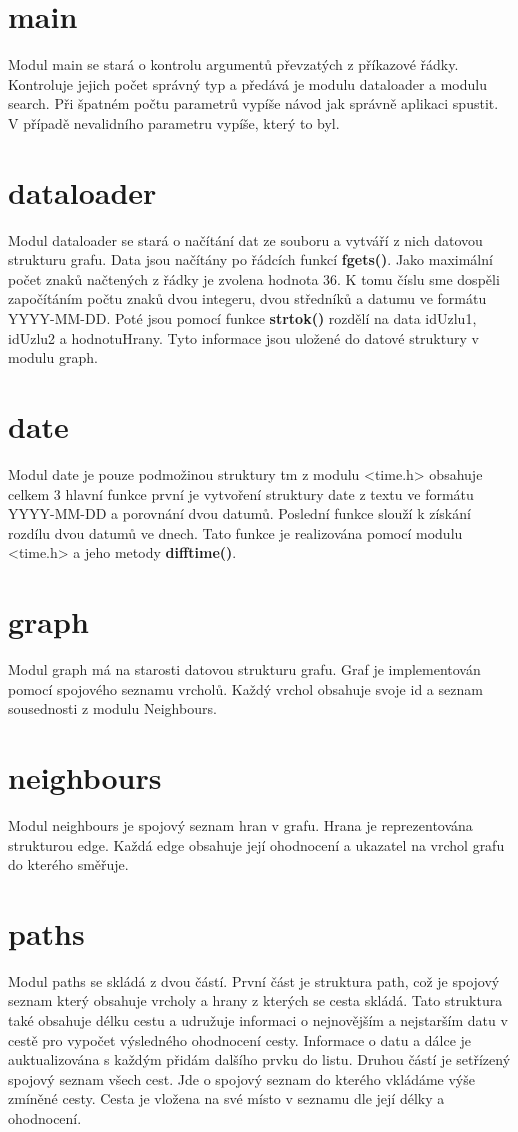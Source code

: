 \section{main}
Modul main se stará o kontrolu argumentů převzatých z příkazové řádky. Kontroluje jejich počet správný typ a předává je modulu dataloader a modulu search. Při špatném počtu parametrů vypíše návod jak správně aplikaci spustit. V případě nevalidního parametru vypíše, který to byl.

\section{dataloader}
Modul dataloader se stará o načítání dat ze souboru a vytváří z nich datovou strukturu grafu. Data jsou načítány po řádcích funkcí \textbf{fgets()}. Jako maximální počet znaků načtených z řádky je zvolena hodnota 36. K tomu číslu sme dospěli započítáním počtu znaků dvou integeru, dvou středníků a datumu ve formátu YYYY-MM-DD. Poté jsou pomocí funkce \textbf{strtok()} rozdělí na data idUzlu1, idUzlu2 a hodnotuHrany. Tyto informace jsou uložené do datové struktury v modulu graph.

\section{date}
Modul date je pouze podmožinou struktury tm z modulu <time.h> obsahuje celkem 3 hlavní funkce první je vytvoření struktury date z textu ve formátu YYYY-MM-DD a porovnání dvou datumů. Poslední funkce slouží k získání rozdílu dvou datumů ve dnech. Tato funkce je realizována pomocí modulu <time.h> a jeho metody \textbf{difftime()}.

\section{graph}
Modul graph má na starosti datovou strukturu grafu. Graf je implementován pomocí spojového seznamu vrcholů. Každý vrchol obsahuje svoje id a seznam sousednosti z modulu Neighbours.

\section{neighbours}
Modul neighbours je spojový seznam hran v grafu. Hrana je reprezentována strukturou edge. Každá edge obsahuje její ohodnocení a ukazatel na vrchol grafu do kterého směřuje.

\section{paths}
Modul paths se skládá z dvou částí. První část je struktura path, což je spojový seznam který obsahuje vrcholy a hrany z kterých se cesta skládá. Tato struktura také obsahuje délku cestu a udružuje informaci o nejnovějším a nejstarším datu v cestě pro vypočet výsledného ohodnocení cesty. Informace o datu a dálce je auktualizována s každým přidám dalšího prvku do listu. Druhou částí je setřízený spojový seznam všech cest. Jde o spojový seznam do kterého vkládáme výše zmíněné cesty. Cesta je vložena na své místo v seznamu dle její délky a ohodnocení.

